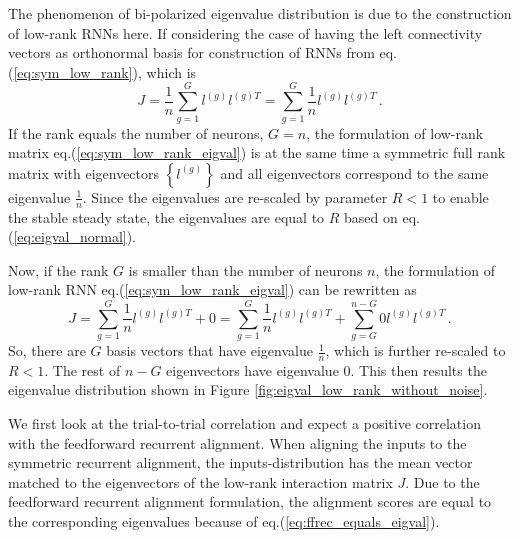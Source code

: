 \documentclass[11pt]{article}
\begin{document}
	The phenomenon of bi-polarized eigenvalue distribution is due to the construction of low-rank RNNs here. If considering the case of having the left connectivity vectors as orthonormal basis for construction of RNNs from eq.(\ref{eq:sym_low_rank}), which is
		\begin{equation} \label{eq:sym_low_rank_eigval}
			J = \frac{1}{n}\sum_{g =1}^{G} l^{(g)} l^{(g)T} = \sum_{g =1}^{G} \frac{1}{n} l^{(g)} l^{(g)T}\, . 
		\end{equation}
	If the rank equals the number of neurons, $G = n$, the formulation of low-rank matrix eq.(\ref{eq:sym_low_rank_eigval}) is at the same time a symmetric full rank matrix with eigenvectors $\left\{l^{(g)}\right\}$ and all eigenvectors correspond to the same eigenvalue $\frac{1}{n}$. Since the eigenvalues are re-scaled by parameter $R < 1$ to enable the stable steady state, the eigenvalues are equal to $R$ based on eq.(\ref{eq:eigval_normal}). 
	
	Now, if the rank $G$ is smaller than the number of neurons $n$, the formulation of low-rank RNN eq.(\ref{eq:sym_low_rank_eigval}) can be rewritten as 
		\begin{equation} \label{eq:sym_low_rank_without_noise_eigval}
			J = \sum_{g =1}^{G} \frac{1}{n} l^{(g)} l^{(g)T} + 0 = \sum_{g =1}^{G} \frac{1}{n} l^{(g)} l^{(g)T} + \sum_{g =G}^{n-G} 0 l^{(g)} l^{(g)T} \, .
		\end{equation}
	So, there are $G$ basis vectors that have eigenvalue $\frac{1}{n}$, which is further re-scaled to $R < 1$. The rest of $n-G$ eigenvectors have eigenvalue $0$. This then results the eigenvalue distribution shown in Figure \ref{fig:eigval_low_rank_without_noise}. 
	
	We first look at the trial-to-trial correlation and expect a positive correlation with the feedforward recurrent alignment. When aligning the inputs to the symmetric recurrent alignment, the inputs-distribution has the mean vector matched to the eigenvectors of the low-rank interaction matrix $J$. Due to the feedforward recurrent alignment formulation, the alignment scores are equal to the corresponding eigenvalues because of eq.(\ref{eq:ffrec_equals_eigval}). 
	
\end{document}
